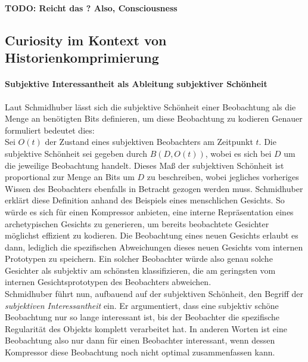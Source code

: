 \textbf{TODO: Reicht das ? Also, Consciousness}

\subsection{Curiosity im Kontext von Historienkomprimierung}


\paragraph{Subjektive Interessantheit als Ableitung subjektiver Schönheit}
\label{sec:Beauty_und_Curiosity}
Laut Schmidhuber lässt sich die subjektive Schönheit einer Beobachtung als die Menge an benötigten Bits definieren, um diese Beobachtung zu kodieren \cite[p.~7]{curiosity_schmidhuber} 
Genauer formuliert bedeutet dies: \\
Sei \(O(t)\) der Zustand eines subjektiven Beobachters am Zeitpunkt \(t\). 
Die subjektive Schönheit sei gegeben durch \(B(D,O(t))\), wobei es sich bei \(D\) um die jeweilige Beobachtung handelt.
Dieses Maß der subjektiven Schönheit ist proportional zur Menge an Bits um \(D\) zu beschreiben, wobei jegliches vorheriges Wissen des Beobachters ebenfalls in Betracht gezogen werden muss. \cite[p.~7]{curiosity_schmidhuber}
Schmidhuber erklärt diese Definition anhand des Beispiels eines menschlichen Gesichts. So würde es sich für einen Kompressor anbieten, eine interne Repräsentation eines archetypischen Gesichts zu generieren, um bereits beobachtete Gesichter möglichst effizient zu kodieren. Die Beobachtung eines neuen Gesichts erlaubt es dann, lediglich die spezifischen Abweichungen dieses neuen Gesichts vom internen Prototypen zu speichern. Ein solcher Beobachter würde also genau solche Gesichter als subjektiv am schönsten klassifizieren, die am geringsten vom internen Gesichtsprototypen des Beobachters abweichen. \cite[p.~7]{curiosity_schmidhuber} \\

Schmidhuber führt nun, aufbauend auf der subjektiven Schönheit, den Begriff der \emph{subjektiven Interessantheit} ein. 
Er argumentiert, dass eine subjektiv schöne Beobachtung nur so lange interessant ist, bis der Beobachter die spezifische Regularität des Objekts komplett verarbeitet hat.\cite[p.~7-8]{curiosity_schmidhuber} In anderen Worten ist eine Beobachtung also nur dann für einen Beobachter interessant, wenn dessen Kompressor diese Beobachtung noch nicht optimal zusammenfassen kann. \\


